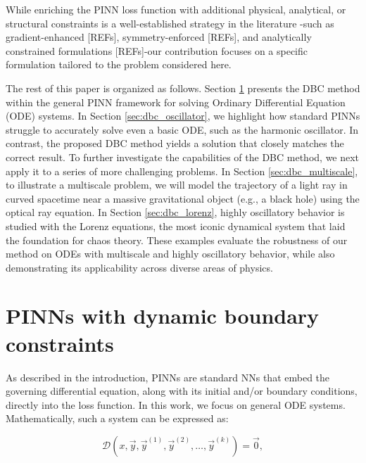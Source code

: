 While enriching the PINN loss function with additional physical, analytical, or structural constraints is a well-established strategy in the literature -such as gradient-enhanced [REFs], symmetry-enforced [REFs], and analytically constrained formulations [REFs]-our contribution focuses on a specific formulation tailored to the problem considered here.

The rest of this paper is organized as follows. Section \ref{sec:dbc_method} presents the DBC method within the general PINN framework for solving Ordinary Differential Equation (ODE) systems. In Section \ref{sec:dbc_oscillator}, we highlight how standard PINNs struggle to accurately solve even a basic ODE, such as the harmonic oscillator. In contrast, the proposed DBC method yields a solution that closely matches the correct result. To further investigate the capabilities of the DBC method, we next apply it to a series of more challenging problems. In Section \ref{sec:dbc_multiscale}, to illustrate a multiscale problem, we will model the trajectory of a light ray in curved spacetime near a massive gravitational object (e.g., a black hole) using the optical ray equation. In Section \ref{sec:dbc_lorenz}, highly oscillatory behavior is studied with the Lorenz equations, the most iconic dynamical system that laid the foundation for chaos theory. These examples evaluate the robustness of our method on ODEs with multiscale and highly oscillatory behavior, while also demonstrating its applicability across diverse areas of physics.


\section{PINNs with dynamic boundary constraints}\label{sec:dbc_method}

As described in the introduction, PINNs are standard NNs that embed the governing differential equation, along with its initial and/or boundary conditions, directly into the loss function. In this work, we focus on general ODE systems. Mathematically, such a system can be expressed as:

\begin{equation}\label{eq:dbc_1}
\mathcal{D}\left(x,\vec{y},\vec{y}^{(1)},\vec{y}^{(2)},\ldots,\vec{y}^{(k)}\right)=\vec{0},
\end{equation}

